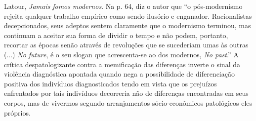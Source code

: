 Latour, \textit{Jamais fomos modernos}.
Na p. 64, diz o autor que \enquote{o pós-modernismo rejeita qualquer trabalho empírico como sendo ilusório e enganador. Racionalistas decepcionados, seus adeptos sentem claramente que o modernismo terminou, mas continuam a aceitar sua forma de dividir o tempo e não podem, portanto, recortar as épocas senão através de revoluções que se sucederiam umas às outras (...) \textit{No future}, é o seu slogan que acrescenta-se ao dos modernos, \textit{No past}.} A crítica despatologizante contra a memificação das diferenças inverte o sinal da violência diagnóstica apontada quando nega a possibilidade de diferenciação positiva dos indivíduos diagnosticados tendo em vista que os prejuízos enfrentados por tais indivíduos decorreria não de diferenças encontradas em seus corpos, mas de vivermos segundo arranjamentos sócio-econômicos patológicos eles próprios.